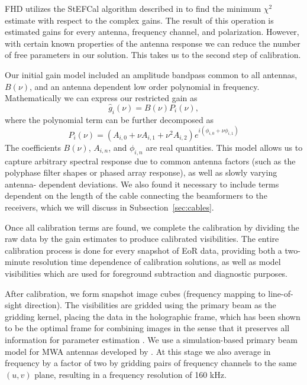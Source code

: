 \documentclass[iop]{emulateapj}
\begin{document}
FHD utilizes the StEFCal algorithm described in \citealt{Salvini:2014} to find the minimum 
$\chi^2$ estimate with respect to the complex gains. The result of this operation is 
estimated gains for every antenna, frequency channel, and polarization. However, with 
certain known properties of the antenna response we can reduce the number of free 
parameters in our solution. This takes us to the second step of calibration.

Our initial gain model included an amplitude bandpass common to all antennas, $B(\nu)$, 
and an antenna dependent low order polynomial in frequency. Mathematically we can 
express our restricted gain as
\begin{equation}\label{eq:cal1}
\hat{g}_i(\nu)=B(\nu)P_i(\nu),
\end{equation}
where the polynomial term can be further decomposed as
\begin{equation}
P_i(\nu) = (A_{i,0} + \nu A_{i,1} + \nu^2 A_{i,2})e^{i (\phi_{i,0} + \nu \phi_{i,1})}
\end{equation}
The coefficients $B(\nu)$, $A_{i,n}$, and $\phi_{i,n}$ are real quantities. This model allows 
us to capture arbitrary spectral response due to common antenna factors (such as the 
polyphase filter shapes or phased array response), as well as slowly varying antenna-
dependent deviations. We also found it necessary to include terms dependent on the 
length of the cable connecting the beamformers to the receivers, which we will discuss in Subsection~\ref{sec:cables}.

Once all calibration terms are found, we complete the calibration by dividing the raw data by 
the gain estimates to produce calibrated visibilities. The entire calibration process is done 
for every snapshot of EoR data, providing both a two-minute resolution time dependence of 
calibration solutions, as well as model visibilities which are used for foreground subtraction 
and diagnostic purposes.

After calibration, we form snapshot image cubes (frequency mapping to line-of-sight 
direction). The visibilities are gridded using the primary beam as the gridding kernel, placing 
the data in the holographic frame, which has been shown to be the optimal frame for 
combining images in the sense that it preserves all information for parameter estimation 
\citep{Morales:2009,Bhatnagar:2008}. We use a simulation-based primary beam model for MWA 
antennas developed by \citealt{Sutinjo:2015}. At this stage we also average in frequency by 
a factor of two by gridding pairs of frequency channels to the same $(u,v)$ plane, resulting in 
a frequency resolution of 160 kHz. 
\end{document}
